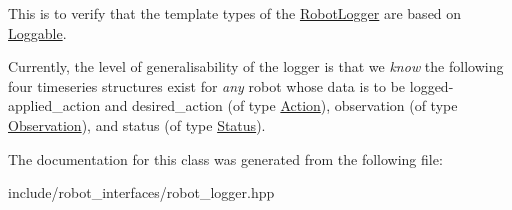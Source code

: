 This is to verify that the template types of the \hyperlink{classrobot__interfaces_1_1RobotLogger}{Robot\+Logger} are based on \hyperlink{classrobot__interfaces_1_1Loggable}{Loggable}. 

Currently, the level of generalisability of the logger is that we {\itshape know} the following four timeseries structures exist for {\itshape any} robot whose data is to be logged-\/ applied\+\_\+action and desired\+\_\+action (of type \hyperlink{classAction}{Action}), observation (of type \hyperlink{classObservation}{Observation}), and status (of type \hyperlink{structrobot__interfaces_1_1Status}{Status}). 

The documentation for this class was generated from the following file\+:\begin{DoxyCompactItemize}
\item 
include/robot\+\_\+interfaces/robot\+\_\+logger.\+hpp\end{DoxyCompactItemize}
